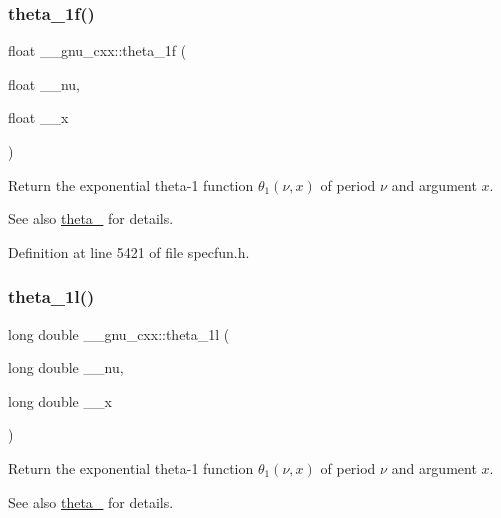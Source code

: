 \subsubsection{\texorpdfstring{theta\+\_\+1f()}{theta\_1f()}}
{\footnotesize\ttfamily float \+\_\+\+\_\+gnu\+\_\+cxx\+::theta\+\_\+1f (\begin{DoxyParamCaption}\item[{float}]{\+\_\+\+\_\+nu,  }\item[{float}]{\+\_\+\+\_\+x }\end{DoxyParamCaption})\hspace{0.3cm}{\ttfamily [inline]}}

Return the exponential theta-\/1 function $ \theta_1(\nu,x) $ of period $ \nu $ and argument $ x $.

\begin{DoxySeeAlso}{See also}
\hyperlink{group__gnu__math__spec__func_gaa2e5a3a5f550fe032a596a8b01c878c0}{theta\+\_} for details. 
\end{DoxySeeAlso}


Definition at line 5421 of file specfun.\+h.

\mbox{\label{group__gnu__math__spec__func_ga3520684c78771ffa57180060c8b6d1ca}} 
\subsubsection{\texorpdfstring{theta\+\_\+1l()}{theta\_1l()}}
{\footnotesize\ttfamily long double \+\_\+\+\_\+gnu\+\_\+cxx\+::theta\+\_\+1l (\begin{DoxyParamCaption}\item[{long double}]{\+\_\+\+\_\+nu,  }\item[{long double}]{\+\_\+\+\_\+x }\end{DoxyParamCaption})\hspace{0.3cm}{\ttfamily [inline]}}

Return the exponential theta-\/1 function $ \theta_1(\nu,x) $ of period $ \nu $ and argument $ x $.

\begin{DoxySeeAlso}{See also}
\hyperlink{group__gnu__math__spec__func_gaa2e5a3a5f550fe032a596a8b01c878c0}{theta\+\_} for details. 
\end{DoxySeeAlso}


